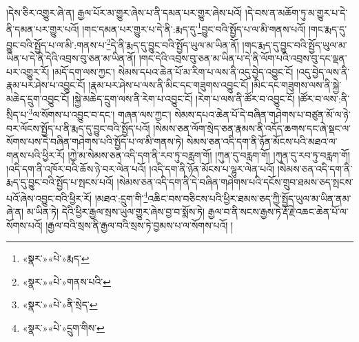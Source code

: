 །དེས་ཅིར་འགྱུར་ཞེ་ན། རྒྱལ་པོར་མ་གྱུར་ཞེས་པ་ནི་དམན་པར་གྱུར་ཞེས་པའོ། །དེ་བས་ན་མཆོག་ཏུ་མ་གྱུར་པ་དེ་ནི་དམན་པར་གྱུར་པའོ། །གང་དམན་པར་གྱུར་པ་དེ་ནི་:རྨད་དུ་\footnote{«སྣར་»«པེ་»རྨད་}བྱུང་བའི་སྤྱོད་པ་ལ་མི་གནས་པའོ། །གང་རྨད་དུ་བྱུང་བའི་སྤྱོད་པ་ལ་མི་:གནས་པ་\footnote{«སྣར་»«པེ་»གནས་པའི་}དེ་ནི་རྨད་དུ་བྱུང་བའི་སྤྱོད་ཡུལ་མ་ཡིན་ནོ། །གང་རྨད་དུ་བྱུང་བའི་སྤྱོད་ཡུལ་མ་ཡིན་པ་དེ་ནི་དེའི་འབྲས་བུ་ཅན་མ་ཡིན་ནོ། །གང་དེའི་འབྲས་བུ་ཅན་མ་ཡིན་པ་དེ་ནི་ལོག་པའི་འབྲས་བུ་དང་ལྡན་པར་འགྱུར་རོ། །མདོ་དག་ལས་ཀྱང་། སེམས་དཔའ་ཆེན་པོ་མ་རིག་པ་ལས་ནི་འདུ་བྱེད་འབྱུང་ངོ། །འདུ་བྱེད་ལས་ནི་རྣམ་པར་ཤེས་པ་འབྱུང་ངོ། །རྣམ་པར་ཤེས་པ་ལས་ནི་མིང་དང་གཟུགས་འབྱུང་ངོ། །མིང་དང་གཟུགས་ལས་ནི་སྐྱེ་མཆེད་དྲུག་འབྱུང་ངོ། །སྐྱེ་མཆེད་དྲུག་ལས་ནི་རེག་པ་འབྱུང་ངོ། །རེག་པ་ལས་ནི་ཚོར་བ་འབྱུང་ངོ། །ཚོར་བ་ལས་:ནི་སྲིད་པ་\footnote{«སྣར་»«པེ་»ནི་སྲེད་}ལ་སོགས་པ་འབྱུང་བ་དང་། གཞན་ལས་ཀྱང་། སེམས་དཔའ་ཆེན་པོ་དེ་བཞིན་གཤེགས་པ་བཙུན་མོ་ལ་ཉེ་བར་ལོངས་སྤྱོད་པ་ནི་རྨད་དུ་བྱུང་བའི་སྤྱོད་པའོ། །སེམས་ཅན་ལོག་སྲེད་ཅན་རྣམས་ནི་འདོད་ཆགས་དང་ཞེ་སྡང་ལ་སོགས་པས་དེ་བཞིན་གཤེགས་པའི་སྤྱོད་པ་ལ་མི་གནས་ཏེ། སེམས་ཅན་འདི་དག་ནི་ཉོན་མོངས་པའི་མཐའ་ལ་གནས་པའི་ཕྱིར་རོ། །ཀྱེ་མ་སེམས་ཅན་འདི་དག་ནི་རབ་ཏུ་བརླག་གོ། །ཀུན་དུ་བརླག་གོ། །ཀུན་དུ་རབ་ཏུ་བརླག་གོ། །འདི་དག་ནི་འཁོར་བའི་ཆོས་ཉེ་བར་ལེན་པའོ། །འདི་དག་ནི་ཉོན་མོངས་པ་ལྷུར་ལེན་པའོ། །སེམས་ཅན་འདི་དག་ནི་རྨད་དུ་བྱུང་བའི་སྤྱོད་པ་སྤངས་པའོ། །སེམས་ཅན་འདི་དག་ནི་དེ་བཞིན་གཤེགས་པའི་དངོས་གྲུབ་ཐམས་ཅད་སྤངས་པའོ་ཞེས་འབྱུང་བའི་ཕྱིར་རོ། །མཐའ་:དྲུག་གི་\footnote{«སྣར་»«པེ་»དྲུག་གིས་}འཆིང་བས་བཅིངས་པའི་ཕྱིར་ཐམས་ཅད་ཀྱི་སྤྱོད་ཡུལ་མ་ཡིན་ནམ་ཞེ་ན། མ་ཡིན་ཏེ། དེའི་ཕྱིར་རྒྱལ་སྲས་ཡུལ་གྱུར་ཞེས་བྱ་བ་སྨོས་ཏེ། རྒྱལ་བ་ནི་སངས་རྒྱས་ཏེ་རྡོ་རྗེ་འཆང་ཆེན་པོ་ལ་སོགས་པའོ། །རྒྱལ་བའི་སྲས་ནི་རྒྱལ་བའི་སྲས་ཏེ་བྱམས་པ་ལ་སོགས་པའོ། །
